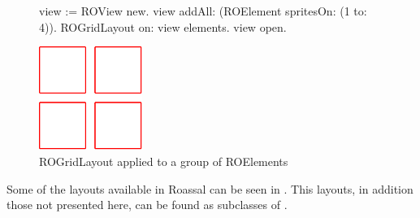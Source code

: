 \documentclass[a4paper,10pt,twoside]{book}
\begin{document}
\begin{figure}[H]
\label{fig:primerLayout}
      \begin{minipage}[t]{0.55\textwidth}
      \vspace{0pt}
     \begin{code}{}
view := ROView new.
view addAll: (ROElement spritesOn: (1 to: 4)).
ROGridLayout on: view elements.
view open.
  \end{code}
   \end{minipage}
   \hfill
   \begin{minipage}[t]{0.6\textwidth}
      \vspace{0pt} \raggedright
       \centering
		\includegraphics[width=0.3\textwidth]{ROGrid2} %
   \end{minipage}

\caption{ROGridLayout applied to a group of ROElements}
\end{figure} 

Some of the layouts available in Roassal can be seen in . This layouts, in addition those not presented here, can be found as subclasses of .
\end{document}
